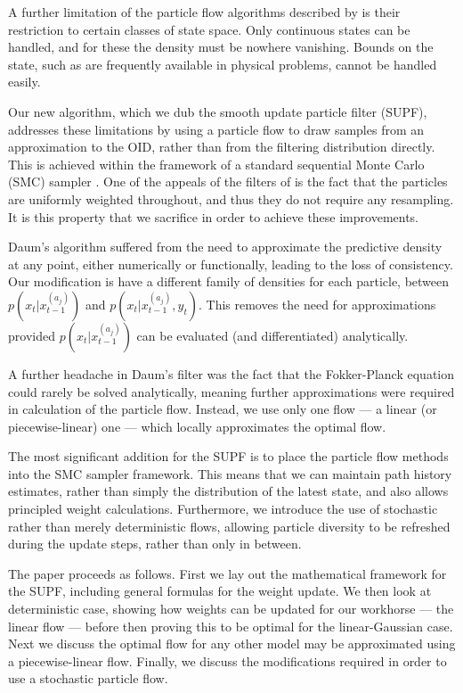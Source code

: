 \documentclass[a4paper,10pt]{article}
\begin{document}
A further limitation of the particle flow algorithms described by \cite{Daum2011d} is their restriction to certain classes of state space. Only continuous states can be handled, and for these the density must be nowhere vanishing. Bounds on the state, such as are frequently available in physical problems, cannot be handled easily.

Our new algorithm, which we dub the smooth update particle filter (SUPF), addresses these limitations by using a particle flow to draw samples from an approximation to the OID, rather than from the filtering distribution directly. This is achieved within the framework of a standard sequential Monte Carlo (SMC) sampler \cite{DelMoral2006}. One of the appeals of the filters of \cite{2011d,Reich2011} is the fact that the particles are uniformly weighted throughout, and thus they do not require any resampling. It is this property that we sacrifice in order to achieve these improvements.




Daum's algorithm suffered from the need to approximate the predictive density at any point, either numerically or functionally, leading to the loss of consistency. Our modification is have a different family of densities for each particle, between $p(x_t|x_{t-1}^{(a_j)})$ and $p(x_t|x_{t-1}^{(a_j)}, y_{t})$. This removes the need for approximations provided $p(x_t|x_{t-1}^{(a_j)})$ can be evaluated (and differentiated) analytically.

A further headache in Daum's filter was the fact that the Fokker-Planck equation could rarely be solved analytically, meaning further approximations were required in calculation of the particle flow. Instead, we use only one flow --- a linear (or piecewise-linear) one --- which locally approximates the optimal flow.

The most significant addition for the SUPF is to place the particle flow methods into the SMC sampler framework. This means that we can maintain path history estimates, rather than simply the distribution of the latest state, and also allows principled weight calculations. Furthermore, we introduce the use of stochastic rather than merely deterministic flows, allowing particle diversity to be refreshed during the update steps, rather than only in between.

The paper proceeds as follows. First we lay out the mathematical framework for the SUPF, including general formulas for the weight update. We then look at deterministic case, showing how weights can be updated for our workhorse --- the linear flow --- before then proving this to be optimal for the linear-Gaussian case. Next we discuss the optimal flow for any other model may be approximated using a piecewise-linear flow. Finally, we discuss the modifications required in order to use a stochastic particle flow.
\end{document}
